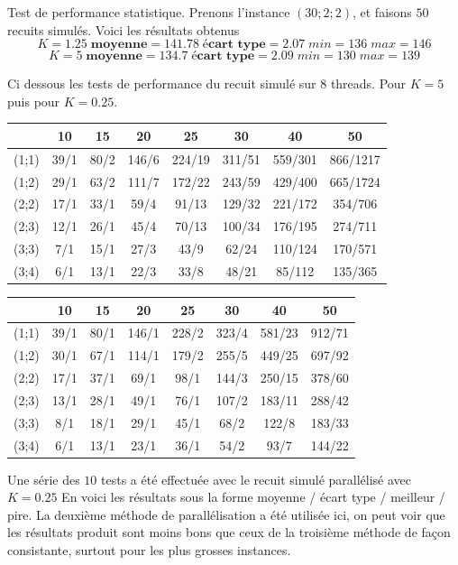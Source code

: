 \documentclass[12pt,a4paper]{article}
\begin{document}
Test de performance statistique. Prenons l'instance $(30;2;2)$, et faisons $50$ recuits simulés. Voici les résultats obtenus
\[ K=1.25 \; \textbf{moyenne}=141.78 \; \textbf{écart type}=2.07 \; min=136 \; max=146\]
\[ K=5 \; \textbf{moyenne}=134.7 \; \textbf{écart type}=2.09 \; min=130 \; max=139\]

Ci dessous les tests de performance du recuit simulé sur $8$ threads. Pour $K=5$ puis pour $K=0.25$.

\begin{center}
\begin{tabular}{|c|c|c|c|c|c|c|c|}
\hline
&10 & 15 & 20 & 25 & 30 & 40 & 50\\
\hline 
(1;1) & 39/1 & 80/2 & 146/6 & 224/19 & 311/51 & 559/301 & 866/1217 \\ 
\hline 
(1;2) & 29/1 & 63/2 & 111/7 & 172/22 & 243/59 & 429/400 & 665/1724 \\ 
\hline 
(2;2) & 17/1 & 33/1 & 59/4 & 91/13 & 129/32 & 221/172 & 354/706 \\ 
\hline 
(2;3) & 12/1 & 26/1 & 45/4& 70/13 & 100/34 & 176/195 & 274/711 \\ 
\hline 
(3;3) & 7/1 & 15/1 & 27/3 & 43/9 & 62/24 & 110/124 & 170/571 \\ 
\hline 
(3;4) & 6/1 & 13/1 & 22/3 & 33/8 & 48/21 & 85/112 & 135/365 \\ 
\hline 
\end{tabular} 

\begin{tabular}{|c|c|c|c|c|c|c|c|}
\hline
&10 & 15 & 20 & 25 & 30 & 40 & 50\\
\hline 
(1;1) & 39/1 & 80/1 & 146/1 & 228/2 & 323/4 & 581/23 & 912/71 \\ 
\hline 
(1;2) & 30/1 & 67/1 & 114/1 & 179/2 & 255/5 & 449/25 & 697/92 \\ 
\hline 
(2;2) & 17/1 & 37/1 & 69/1 & 98/1 & 144/3 & 250/15 & 378/60 \\ 
\hline 
(2;3) & 13/1 & 28/1 & 49/1& 76/1 & 107/2 & 183/11 & 288/42 \\ 
\hline 
(3;3) & 8/1 & 18/1 & 29/1 & 45/1 & 68/2 & 122/8 & 183/33 \\ 
\hline 
(3;4) & 6/1 & 13/1 & 23/1 & 36/1 & 54/2 & 93/7 & 144/22 \\ 
\hline 
\end{tabular}
\end{center} 

Une série des $10$ tests a été effectuée avec le recuit simulé parallélisé avec $K=0.25$
En voici les résultats sous la forme moyenne / écart type / meilleur / pire. La deuxième méthode de parallélisation a été utilisée ici, on peut voir que les résultats produit sont moins bons que ceux de la troisième méthode de façon consistante, surtout pour les plus grosses instances.
\end{document}
